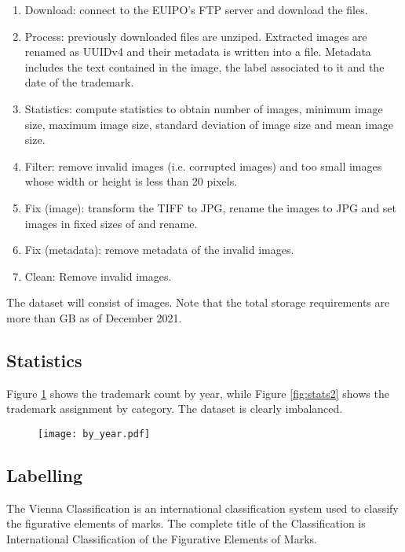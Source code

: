 \documentclass{article}
\begin{document}
\begin{enumerate}
    \item Download: connect to the EUIPO's FTP server and download the files.
    \item Process: previously downloaded files are unziped. Extracted images are renamed as UUIDv4 and their metadata is written into a file. Metadata includes the text contained in the image, the label associated to it and the date of the trademark.
    \item Statistics: compute statistics to obtain number of images, minimum image size, maximum image size, standard deviation of image size and mean image size.
    \item Filter: remove invalid images (i.e. corrupted images) and too small images whose width or height is less than 20 pixels.
    \item Fix (image): transform the TIFF to JPG, rename the images to JPG and set images in fixed sizes of  and rename.
    \item Fix (metadata): remove metadata of the invalid images.
    \item Clean: Remove invalid images.
\end{enumerate}

The dataset will consist of  images. Note that the total storage requirements are more than  GB as of December 2021.

\subsection{Statistics}

Figure \ref{fig:stats} shows the trademark count by year, while Figure \ref{fig:stats2} shows the trademark assignment by category. The dataset is clearly imbalanced.

\begin{figure}[t]
\texttt{[image: by\_year.pdf]}
\label{fig:stats}
\centering
\end{figure}





\subsection{Labelling}
The Vienna Classification is an international classification system used to classify the figurative elements of marks. The complete title of the Classification is International Classification of the Figurative Elements of Marks.
\end{document}

